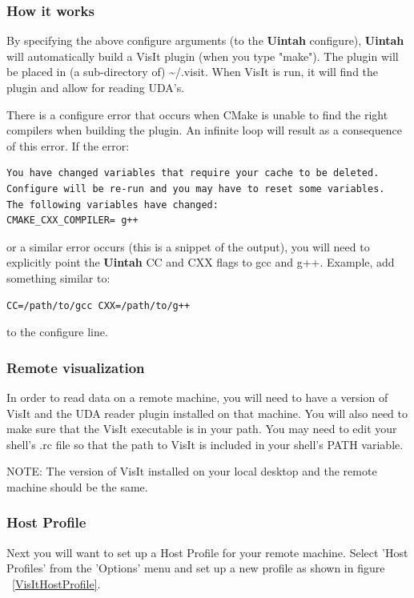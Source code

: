 \documentclass[12pt]{article}
\begin{document}
\subsubsection{How it works}
By specifying the above configure arguments (to the \textbf{Uintah}
configure), \textbf{Uintah} will automatically build a VisIt plugin
(when you type "make"). The plugin will be placed in (a sub-directory
of) \textasciitilde/.visit. When VisIt is run, it will find the plugin
and allow for reading UDA's.


There is a configure error that occurs when CMake is unable to find the
right compilers when building the plugin.  An infinite loop will result
as a consequence of this error.  If the error:

\begin{verbatim}
You have changed variables that require your cache to be deleted.
Configure will be re-run and you may have to reset some variables.
The following variables have changed:
CMAKE_CXX_COMPILER= g++
\end{verbatim}

\noindent or a similar error occurs (this is a snippet of the output), you will 
need to explicitly point the \textbf{Uintah} CC and CXX flags to gcc 
and g++.  Example, add something similar to:

\begin{verbatim}
CC=/path/to/gcc CXX=/path/to/g++
\end{verbatim}

\noindent to the configure line. 

\subsubsection{Remote visualization}
In order to read data on a remote machine, you will need to have a
version of VisIt and the UDA reader plugin installed on that
machine. You will also need to make sure that the VisIt executable is
in your path. You may need to edit your shell's .rc file so that the
path to VisIt is included in your shell's PATH variable.

NOTE: The version of VisIt installed on your local desktop and the
remote machine should be the same.

\subsubsection{Host Profile}
Next you will want to set up a Host Profile for your remote
machine. Select 'Host Profiles' from the 'Options' menu and set up a
new profile as shown in figure ~\ref{VisItHostProfile}.
\end{document}
